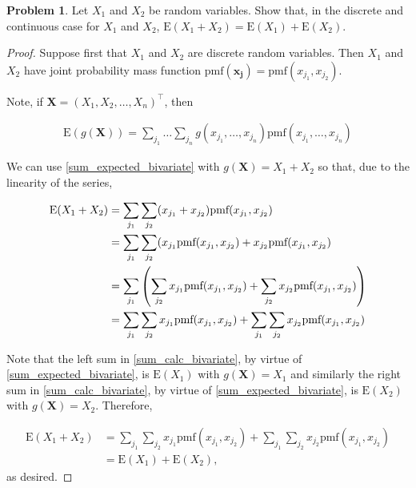 \documentclass[12pt]{article}
\theoremstyle{definition}
\newtheorem{problem}{Problem}
\newcommand{\E}{\text{E}}
\newcommand{\pmf}{\text{pmf}}
\newcommand{\vect}[1]{\boldsymbol{#1}}
\begin{document}
\begin{problem}
  Let $X_1$ and $X_2$ be random variables. Show that, in the
  discrete and continuous case for $X_1$ and $X_2$,
  $\E(X_1 + X_2) = \E(X_1) + \E(X_2).$
\end{problem}

\begin{proof}

  Suppose first that $X_1$ and $X_2$ are discrete random variables. Then
  $X_1$ and $X_2$ have joint probability mass function $\pmf(\vect{x_j}) = \pmf(x_{j_1}, x_{j_2}).$

  Note, if $\vect{X} =(X_1, X_2, \dots, X_n)^\intercal$, then

  \begin{align}\label{sum_expected_bivariate}
    \E(g(\vect{X})) = \sum_{j_1} \dots \sum_{j_n} g(x_{j_1}, \dots, x_{j_n}) \pmf(x_{j_1}, \dots, x_{j_n})
  \end{align}

  We can use \eqref{sum_expected_bivariate} with $g(\vect{X}) = X_1 + X_2$ so that, due to the linearity of the series,

  \begin{align}\label{sum_calc_bivariate}
    \E(X_1 + X_2)
    &= \sum_{j_1} \sum_{j_2} (x_{j_1} + x_{j_2})\pmf(x_{j_1}, x_{j_2}) \notag \\
    &= \sum_{j_1} \sum_{j_2} (x_{j_1}\pmf(x_{j_1}, x_{j_2}) + x_{j_2}\pmf(x_{j_1}, x_{j_2}) \notag \\
    &= \sum_{j_1} \left( \sum_{j_2} x_{j_1}\pmf(x_{j_1}, x_{j_2}) + \sum_{j_2} x_{j_2}\pmf(x_{j_1}, x_{j_2}) \right) \notag \\
    &= \sum_{j_1} \sum_{j_2} x_{j_1}\pmf(x_{j_1}, x_{j_2}) + \sum_{j_1} \sum_{j_2} x_{j_2}\pmf(x_{j_1}, x_{j_2})
  \end{align}

  Note that the left sum in \eqref{sum_calc_bivariate}, by virtue of \eqref{sum_expected_bivariate}, is
  $\E(X_1)$ with $g(\vect{X}) = X_1$ and similarly the right sum in
  \eqref{sum_calc_bivariate}, by virtue of \eqref{sum_expected_bivariate}, is $\E(X_2)$ with
  $g(\vect{X}) = X_2$. Therefore,

  \begin{align*}
    \E(X_1 + X_2)
    &= \sum_{j_1} \sum_{j_2} x_{j_1}\pmf(x_{j_1}, x_{j_2}) + \sum_{j_1} \sum_{j_2} x_{j_2}\pmf(x_{j_1}, x_{j_2}) \\
    &= \E(X_1) + \E(X_2),
  \end{align*}
  as desired.


\end{proof}
\end{document}
